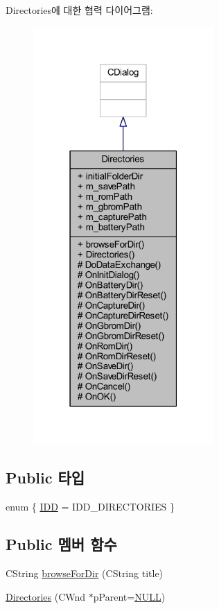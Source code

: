 Directories에 대한 협력 다이어그램\+:\nopagebreak
\begin{figure}[H]
\begin{center}
\leavevmode
\includegraphics[width=195pt]{class_directories__coll__graph}
\end{center}
\end{figure}
\subsection*{Public 타입}
\begin{DoxyCompactItemize}
\item 
enum \{ \mbox{\hyperlink{class_directories_af0d05207ae8fd4572edf7950c207d6c0a6b2cbc79bd35885c2f543f480aa0b2e6}{I\+DD}} = I\+D\+D\+\_\+\+D\+I\+R\+E\+C\+T\+O\+R\+I\+ES
 \}
\end{DoxyCompactItemize}
\subsection*{Public 멤버 함수}
\begin{DoxyCompactItemize}
\item 
C\+String \mbox{\hyperlink{class_directories_a7e24bf265fe6af9c01e0939952c337e1}{browse\+For\+Dir}} (C\+String title)
\item 
\mbox{\hyperlink{class_directories_a03ef542d611759b1b619742e0bde92e7}{Directories}} (C\+Wnd $\ast$p\+Parent=\mbox{\hyperlink{_system_8h_a070d2ce7b6bb7e5c05602aa8c308d0c4}{N\+U\+LL}})
\end{DoxyCompactItemize}
